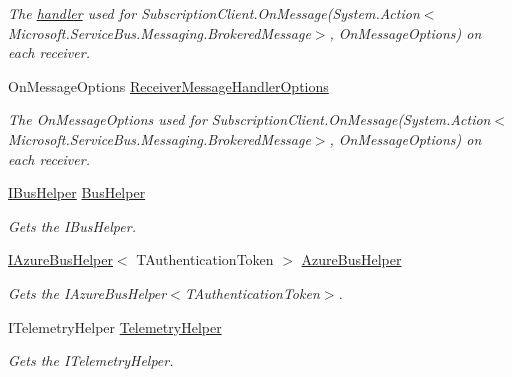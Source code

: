 \begin{DoxyCompactItemize}
\begin{DoxyCompactList}\small\item\em The \hyperlink{}{handler} used for Subscription\+Client.\+On\+Message(\+System.\+Action$<$\+Microsoft.\+Service\+Bus.\+Messaging.\+Brokered\+Message$>$, On\+Message\+Options) on each receiver. \end{DoxyCompactList}\item 
On\+Message\+Options \hyperlink{classCqrs_1_1Azure_1_1ServiceBus_1_1AzureServiceBus_abe75d8be8b9ffbc5a37164467963babd_abe75d8be8b9ffbc5a37164467963babd}{Receiver\+Message\+Handler\+Options}
\begin{DoxyCompactList}\small\item\em The On\+Message\+Options used for Subscription\+Client.\+On\+Message(\+System.\+Action$<$\+Microsoft.\+Service\+Bus.\+Messaging.\+Brokered\+Message$>$, On\+Message\+Options) on each receiver. \end{DoxyCompactList}\item 
\hyperlink{interfaceCqrs_1_1Bus_1_1IBusHelper}{I\+Bus\+Helper} \hyperlink{classCqrs_1_1Azure_1_1ServiceBus_1_1AzureServiceBus_aba45a2bece8e265b9f06695b1e90a2a1_aba45a2bece8e265b9f06695b1e90a2a1}{Bus\+Helper}
\begin{DoxyCompactList}\small\item\em Gets the I\+Bus\+Helper. \end{DoxyCompactList}\item 
\hyperlink{interfaceCqrs_1_1Azure_1_1ServiceBus_1_1IAzureBusHelper}{I\+Azure\+Bus\+Helper}$<$ T\+Authentication\+Token $>$ \hyperlink{classCqrs_1_1Azure_1_1ServiceBus_1_1AzureServiceBus_a7c537c53265bf01d550982c04579493e_a7c537c53265bf01d550982c04579493e}{Azure\+Bus\+Helper}
\begin{DoxyCompactList}\small\item\em Gets the I\+Azure\+Bus\+Helper$<$\+T\+Authentication\+Token$>$. \end{DoxyCompactList}\item 
I\+Telemetry\+Helper \hyperlink{classCqrs_1_1Azure_1_1ServiceBus_1_1AzureServiceBus_af5f6d62cbdb3ad711ea42505491ffca3_af5f6d62cbdb3ad711ea42505491ffca3}{Telemetry\+Helper}
\begin{DoxyCompactList}\small\item\em Gets the I\+Telemetry\+Helper. \end{DoxyCompactList}\item 

\end{DoxyCompactItemize}
